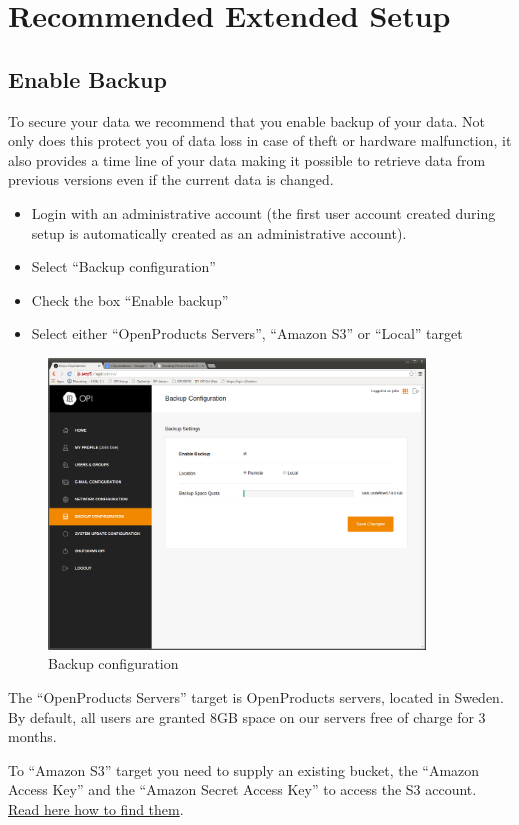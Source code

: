 \documentclass[12pt,a4paper,titlepage]{article}
\begin{document}
\newpage
\section{Recommended Extended Setup}
\subsection{Enable Backup}
To secure your data we recommend that you enable backup of your data. Not only does this protect you of data loss in case of theft or hardware malfunction, it also provides a time line of your data making it possible to retrieve data from previous versions even if the current data is changed.
\begin{itemize}
\item Login with an administrative account (the first user account created during setup is automatically created as an administrative account).
\item Select ``Backup configuration''
\item Check the box ``Enable backup''
\item Select either ``OpenProducts Servers'',  ``Amazon S3'' or ``Local'' target
\end{itemize}

\begin{figure}[h!]
\centering
\includegraphics[width=10cm]{./img/backup_config}
\caption{Backup configuration}
\end{figure}

The ``OpenProducts Servers'' target is OpenProducts servers, located in Sweden. By default, all users are granted 8GB space on our servers free of charge for 3 months.

To ``Amazon S3'' target you need to supply an existing bucket, the ``Amazon Access Key'' and the ``Amazon Secret Access Key'' to access the S3 account. \href{http://www.ezs3.com/public/231.cfm}{Read here how to find them}.
\end{document}
